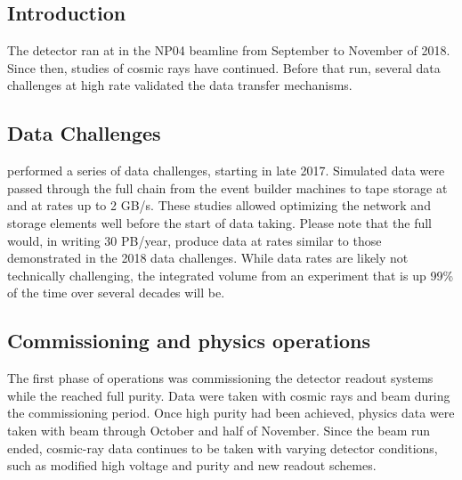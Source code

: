 \subsection{Introduction}

The  detector ran at  in the NP04 beamline from September to November of 2018. Since then, studies of cosmic rays have continued. Before that run, several data challenges at high rate validated the data transfer mechanisms. 

\subsection{Data Challenges}

 performed a series of data challenges, starting in late 2017.  Simulated data were passed through the full chain from the event builder machines to tape storage at  and  at rates up to 2 GB/s.  These studies allowed optimizing the network and storage elements well before the start of data taking.
Please note that the full   would, in writing 30 PB/year, produce data at rates similar to  those demonstrated in the 2018 data challenges. While data rates are likely not technically challenging, the integrated volume from an experiment that is up 99\% of the time over several decades will be. 

\subsection{Commissioning and physics operations}

The first phase of operations was commissioning the detector readout systems while the  reached full purity.  Data were taken with cosmic rays and beam during the commissioning period. Once high  purity had been achieved, physics data were  taken with beam through October and half of November. %
Since the beam run ended, cosmic-ray data continues to be taken with varying detector conditions, such as modified high voltage and purity and new readout schemes. 



